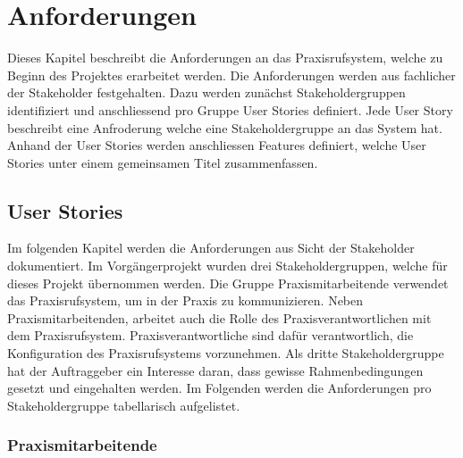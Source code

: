 \section{Anforderungen}\label{sec:anforderungen}

Dieses Kapitel beschreibt die Anforderungen an das Praxisrufsystem, welche zu Beginn des Projektes erarbeitet werden.
Die Anforderungen werden aus fachlicher der Stakeholder festgehalten.
Dazu werden zunächst Stakeholdergruppen identifiziert und anschliessend pro Gruppe User Stories definiert.
Jede User Story beschreibt eine Anfroderung welche eine Stakeholdergruppe an das System hat.
Anhand der User Stories werden anschliessen Features definiert, welche User Stories unter einem gemeinsamen Titel zusammenfassen.

\subsection{User Stories}

Im folgenden Kapitel werden die Anforderungen aus Sicht der Stakeholder dokumentiert.
Im Vorgängerprojekt wurden drei Stakeholdergruppen, welche für dieses Projekt übernommen werden.
Die Gruppe Praxismitarbeitende verwendet das Praxisrufsystem, um in der Praxis zu kommunizieren.
Neben Praxismitarbeitenden, arbeitet auch die Rolle des Praxisverantwortlichen mit dem Praxisrufsystem.
Praxisverantwortliche sind dafür verantwortlich, die Konfiguration des Praxisrufsystems vorzunehmen.
Als dritte Stakeholdergruppe hat der Auftraggeber ein Interesse daran, dass gewisse Rahmenbedingungen gesetzt und eingehalten werden.\cite{ip5}
Im Folgenden werden die Anforderungen pro Stakeholdergruppe tabellarisch aufgelistet.
\\

\subsubsection{Praxismitarbeitende}

